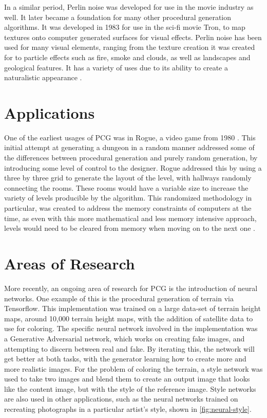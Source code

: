 \documentclass[10pt]{report}
\begin{document}
		In a similar period, Perlin noise was developed for use in the movie industry as well. It later became a foundation for many other procedural generation algorithms. It was developed in 1983 for use in the sci-fi movie Tron, to map textures onto computer generated surfaces for visual effects. Perlin noise has been used for many visual elements, ranging from the texture creation it was created for to particle effects such as fire, smoke and clouds, as well as landscapes and geological features. It has a variety of uses due to its ability to create a naturalistic appearance \cite{10.1145/325165.325247}.
		
		\section{Applications}
		
		One of the earliest usages of PCG was in Rogue, a video game from 1980 \cite{rogue}. This initial attempt at generating a dungeon in a random manner addressed some of the differences between procedural generation and purely random generation, by introducing some level of control to the designer. Rogue addressed this by using a three by three grid to generate the layout of the level, with hallways randomly connecting the rooms. These rooms would have a variable size to increase the variety of levels producible by the algorithm. This randomized methodology in particular, was created to address the memory constraints of computers at the time, as even with this more mathematical and less memory intensive approach, levels would need to be cleared from memory when moving on to the next one \cite{rogue}.
		

		\section{Areas of Research}
	
		More recently, an ongoing area of research for PCG is the introduction of neural networks. One example of this is the procedural generation of terrain via Tensorflow. This implementation was trained on a large data-set of terrain height maps, around 10,000 terrain height maps, with the addition of satellite data to use for coloring. The specific neural network involved in the implementation was a Generative Adversarial network\cite{goodfellow2014generative}, which works on creating fake images, and attempting to discern between real and fake. By iterating this, the network will get better at both tasks, with the generator learning how to create more and more realistic images. For the problem of coloring the terrain, a style network was used to take two images and blend them to create an output image that looks like the content image, but with the style of the reference image. Style networks are also used in other applications, such as the neural networks trained on recreating photographs in a particular artist's style, shown in \autoref{fig:neural-style}. 
		
\end{document}

